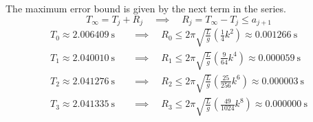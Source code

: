 \documentclass[preview]{standalone}
\begin{document}
\color{white}

The maximum error bound is given by the next term in the series.
\[T_\infty = T_j + R_j \quad \implies \quad R_j = T_\infty - T_j \leq a_{j+1} \]
\begin{align*}
  T_0 \approx \SI{2.006409}{\second} \quad &\implies \quad R_0 \leq 2\pi \sqrt{\frac{L}{g}} \left(\frac{1}{4}k^2\right) \approx \boxed{\SI{0.001266}{\second}} \\
  T_1 \approx \SI{2.040010}{\second} \quad &\implies \quad R_1 \leq 2\pi \sqrt{\frac{L}{g}} \left(\frac{9}{64}k^4\right) \approx \boxed{\SI{0.000059}{\second}} \\
  T_2 \approx \SI{2.041276}{\second} \quad &\implies \quad R_2 \leq 2\pi \sqrt{\frac{L}{g}} \left(\frac{25}{256}k^6\right) \approx \boxed{\SI{0.000003}{\second}} \\
  T_3 \approx \SI{2.041335}{\second} \quad &\implies \quad R_3 \leq 2\pi \sqrt{\frac{L}{g}} \left(\frac{49}{1024}k^8\right) \approx \boxed{\SI{0.000000}{\second}} \\
\end{align*}
\end{document}
